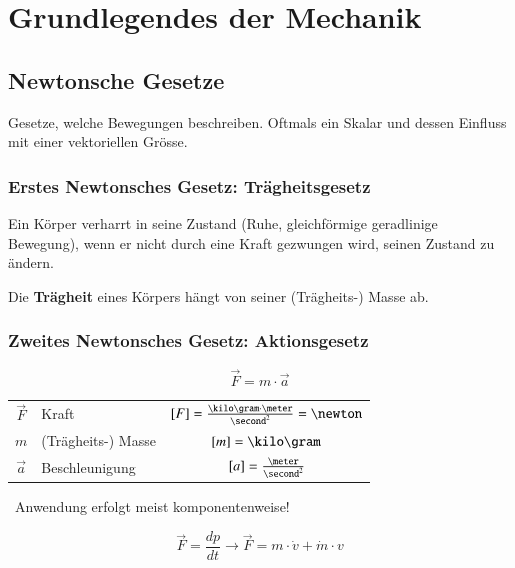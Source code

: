 \section{Grundlegendes der Mechanik}

\subsection{Newtonsche Gesetze}

Gesetze, welche Bewegungen beschreiben. Oftmals ein Skalar und dessen Einfluss mit einer vektoriellen Grösse.


\subsubsection{Erstes Newtonsches Gesetz: Trägheitsgesetz}

Ein Körper verharrt in seine Zustand (Ruhe, gleichförmige geradlinige Bewegung), wenn er nicht durch eine Kraft gezwungen wird, 
seinen Zustand zu ändern.

Die \textbf{Trägheit} eines Körpers hängt von seiner (Trägheits-) Masse ab.


\subsubsection{Zweites Newtonsches Gesetz: Aktionsgesetz}

\begin{minipage}{0.2\columnwidth}
	$$ \boxed {\vec{F} = m \cdot \vec{a} } $$
\end{minipage}
\hfill
\begin{minipage}{0.75\columnwidth}
	\begin{tabular}{c l c}
		$\vec{F}$ 	& Kraft 				& $[F] = \frac{\kilo \gram \cdot \meter}{\second^2}  = \newton$ \\
		$m$ 		& (Trägheits-) Masse 	& $[m] = \kilo \gram$ 											\\	
		$\vec{a}$	&  Beschleunigung 		& $[a] = \frac{\meter}{\second^2}$
	\end{tabular}
\end{minipage}

\vspace{0.2cm}
\textrightarrow\ Anwendung erfolgt meist komponentenweise! \\

\begin{minipage}{0.2\columnwidth}
	$$ \boxed {\vec{F} = \frac{dp}{dt} \rightarrow \vec{F} = m \cdot \dot{v} + \dot{m} \cdot v} $$
\end{minipage}

